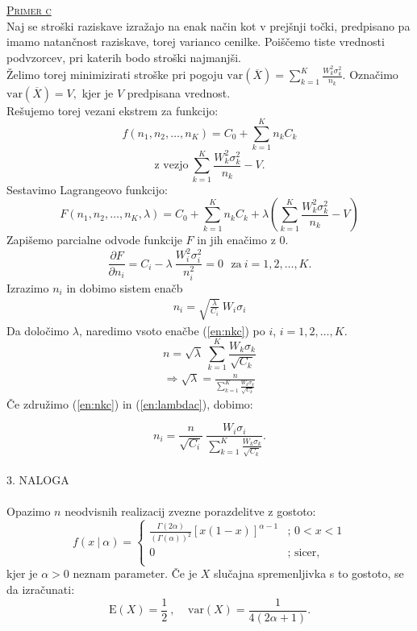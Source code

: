\documentclass[a4paper,12pt]{article}
\begin{document}
\noindent
\textsc{\underline{Primer c}}
\\
Naj se stroški raziskave izražajo na enak način kot v prejšnji točki, predpisano pa imamo natančnost raziskave, torej varianco cenilke. Poiščemo tiste vrednosti podvzorcev, pri katerih bodo stroški najmanjši.
\\
Želimo torej minimizirati stroške pri pogoju $ \text{var}(\overline{X}) = \sum_{k = 1}^{K} \frac{W_k^2 \sigma_k^2}{n_k}.$ Označimo $\text{var}(\overline{X}) = V,$ kjer je $V$ predpisana vrednost.
\\
Rešujemo torej vezani ekstrem za funkcijo:
$$ f (n_1, n_2, \ldots, n_K) = C_0 + \sum_{k = 1}^{K} n_k C_k $$
$$ \text{z vezjo} \ \sum_{k = 1}^{K} \frac{W_k^2 \sigma_k^2}{n_k} - V. $$
Sestavimo Lagrangeovo funkcijo:
$$ F (n_1, n_2, \ldots, n_K, \lambda) = C_0 + \sum_{k = 1}^{K} n_k C_k  + \lambda \left( \sum_{k = 1}^{K} \frac{W_k^2 \sigma_k^2}{n_k} - V \right)$$
Zapišemo parcialne odvode funkcije $F$ in jih enačimo z $0$.
$$ \frac{ \partial F}{\partial n_i} = C_i - \lambda \ \frac{W_i^2 \sigma_i^2}{n_i^2} = 0 \ \ \ \text{za} \ i = 1, 2, \ldots, K.  $$
Izrazimo $n_i$ in dobimo sistem enačb
\begin{align}\label{en:nkc}
n_i = \sqrt{\frac{\lambda}{C_i}} \ W_i \sigma_i
\end{align}
Da določimo $\lambda$, naredimo vsoto enačbe (\ref{en:nkc}) po $i$, $i = 1, 2, \ldots, K.$
$$ n = \sqrt{\lambda} \ \sum_{k = 1}^{K} \frac{W_k \sigma_k}{\sqrt{C_k}} $$
\begin{align}\label{en:lambdac}
\Rightarrow \sqrt{\lambda} = \frac{n}{\sum_{k = 1}^{K} \frac{W_k \sigma_k}{\sqrt{C_k}}}
\end{align}
Če združimo (\ref{en:nkc}) in (\ref{en:lambdac}), dobimo:

$$ n_i = \frac{n}{\sqrt{C_i}} \ \frac{W_i \sigma_i}{\sum_{k = 1}^{K} \frac{W_k \sigma_k}{\sqrt{C_k}}}. $$
\\


\noindent
\textsc{\large{3. NALOGA}}
\\
\\
Opazimo $n$ neodvisnih realizacij zvezne porazdelitve z gostoto:
\begin{displaymath}
    f(x \ | \ \alpha) = \left\{ \begin{array}{ll}
     \frac{\Gamma(2 \alpha)}{(\Gamma (\alpha))^2} \left[ x(1 - x) \right]^{\alpha - 1} & \textrm{; \ $0 < x < 1$}\\
     0 & \textrm{; \ sicer,} \\
    \end{array} \right. 
\end{displaymath}
kjer je $\alpha > 0$ neznam parameter. Če je $X$ slučajna spremenljivka s to gostoto, se da izračunati:
$$ \text{E}(X) = \frac{1}{2} \ , \ \ \ \ \ \text{var}(X) = \frac{1}{4(2 \alpha + 1)}. $$
\\
\end{document}
